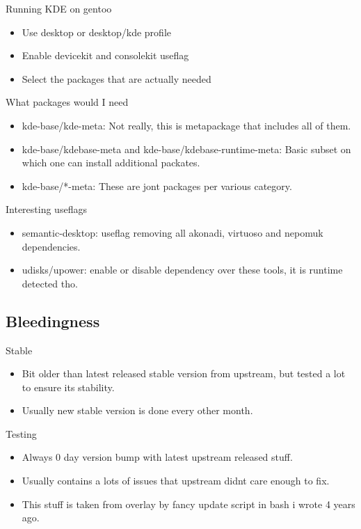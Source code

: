 \documentclass{beamer}
\begin{document}
\begin{frame}{Running KDE on gentoo}
	\begin{itemize}
		\item Use desktop or desktop/kde profile
		\item Enable devicekit and consolekit useflag
		\item Select the packages that are actually needed
	\end{itemize}
\end{frame}

\begin{frame}{What packages would I need}
	\begin{itemize}
		\item kde-base/kde-meta: Not really, this is metapackage that includes all of them.
		\item kde-base/kdebase-meta and kde-base/kdebase-runtime-meta: Basic subset on which one can install additional packates.
		\item kde-base/*-meta: These are jont packages per various category.
	\end{itemize}
\end{frame}

\begin{frame}{Interesting useflags}
	\begin{itemize}
		\item semantic-desktop: useflag removing all akonadi, virtuoso and nepomuk dependencies.
		\item udisks/upower: enable or disable dependency over these tools, it is runtime detected tho.
	\end{itemize}
\end{frame}

\subsection{Bleedingness}
\begin{frame}{Stable}
	\begin{itemize}
		\item Bit older than latest released stable version from upstream, but tested a lot to ensure its stability.
		\item Usually new stable version is done every other month.
	\end{itemize}
\end{frame}

\begin{frame}{Testing}
	\begin{itemize}
		\item Always 0 day version bump with latest upstream released stuff.
		\item Usually contains a lots of issues that upstream didnt care enough to fix.
		\item This stuff is taken from overlay by fancy update script in bash i wrote 4 years ago.
	\end{itemize}
\end{frame}
\end{document}
